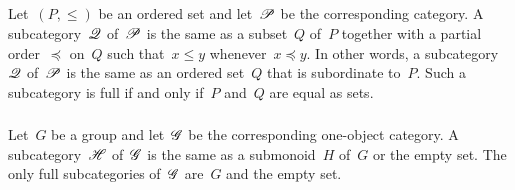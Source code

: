 \subsection{}



\subsubsection{}

Let~$(P, ≤)$ be an ordered set and let~$\mathscr{P}$ be the corresponding category.
A subcategory~$\mathscr{Q}$ of~$\mathscr{P}$ is the same as a subset~$Q$ of~$P$ together with a partial order~$\preceq$ on~$Q$ such that~$x ≤ y$ whenever~$x \preceq y$.
In other words, a subcategory~$\mathscr{Q}$ of~$\mathscr{P}$ is the same as an ordered set~$Q$ that is subordinate to~$P$.
Such a subcategory is full if and only if~$P$ and~$Q$ are equal as sets.



\subsubsection{}

Let~$G$ be a group and let~$\mathscr{G}$ be the corresponding one-object category.
A subcategory~$\mathscr{H}$ of~$\mathscr{G}$ is the same as a submonoid~$H$ of~$G$ or the empty set.
The only full subcategories of~$\mathscr{G}$ are~$G$ and the empty set.
